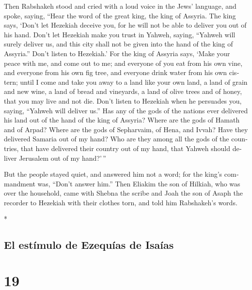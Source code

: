 \begin{paracol}{2}
\begin{otherlanguage}{english}
 Then Rabshakeh stood and cried with a loud voice in the
Jews' language, and spoke, saying, ``Hear the word of the great king,
the king of Assyria.  The king says, `Don't let Hezekiah
deceive you, for he will not be able to deliver you out of his hand.
 Don't let Hezekiah make you trust in Yahweh, saying,
``Yahweh will surely deliver us, and this city shall not be given into
the hand of the king of Assyria.''  Don't listen to
Hezekiah.' For the king of Assyria says, `Make your peace with me, and
come out to me; and everyone of you eat from his own vine, and everyone
from his own fig tree, and everyone drink water from his own cistern;
 until I come and take you away to a land like your own
land, a land of grain and new wine, a land of bread and vineyards, a
land of olive trees and of honey, that you may live and not die. Don't
listen to Hezekiah when he persuades you, saying, ``Yahweh will deliver
us.''  Has any of the gods of the nations ever delivered
his land out of the hand of the king of Assyria?  Where
are the gods of Hamath and of Arpad? Where are the gods of Sepharvaim,
of Hena, and Ivvah? Have they delivered Samaria out of my hand?
 Who are they among all the gods of the countries, that
have delivered their country out of my hand, that Yahweh should deliver
Jerusalem out of my hand?'\,''

 But the people stayed quiet, and answered him not a
word; for the king's commandment was, ``Don't answer him.''
 Then Eliakim the son of Hilkiah, who was over the
household, came with Shebna the scribe and Joah the son of Asaph the
recorder to Hezekiah with their clothes torn, and told him Rabshakeh's
words.

\end{otherlanguage}

\switchcolumn[0]*

\hypertarget{el-estuxedmulo-de-ezequuxedas-de-isauxedas}{%
\subsection{El estímulo de Ezequías de
Isaías}\label{el-estuxedmulo-de-ezequuxedas-de-isauxedas}}

\hypertarget{section-36}{%
\section{19}\label{section-36}}


\end{paracol}
